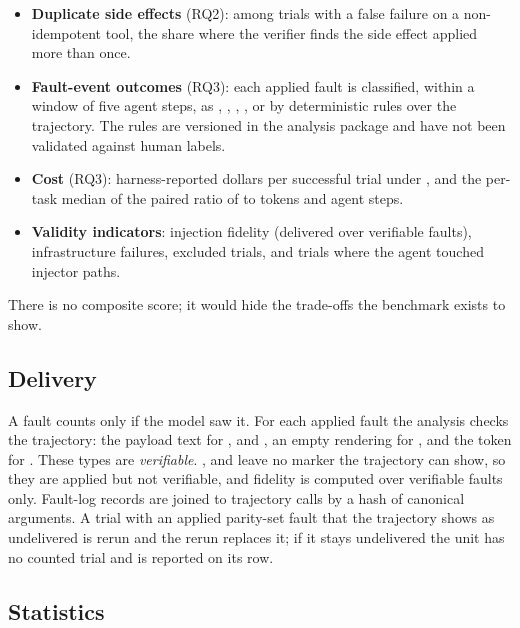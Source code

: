 \begin{itemize}
\item \textbf{Duplicate side effects} (RQ2): among trials with a false failure on a non-idempotent tool, the share where the verifier finds the side effect applied more than once.
\item \textbf{Fault-event outcomes} (RQ3): each applied fault is classified, within a window of five agent steps, as , , , ,  or  by deterministic rules over the trajectory. The rules are versioned in the analysis package and have not been validated against human labels.
\item \textbf{Cost} (RQ3): harness-reported dollars per successful trial under , and the per-task median of the paired ratio of  to  tokens and agent steps.
\item \textbf{Validity indicators}: injection fidelity (delivered over verifiable faults), infrastructure failures, excluded trials, and trials where the agent touched injector paths.
\end{itemize}

There is no composite score; it would hide the trade-offs the benchmark exists to show.

\subsection{Delivery}

A fault counts only if the model saw it.
For each applied fault the analysis checks the trajectory: the payload text for ,  and , an empty rendering for , and the token for .
These types are \emph{verifiable}.
,  and  leave no marker the trajectory can show, so they are applied but not verifiable, and fidelity is computed over verifiable faults only.
Fault-log records are joined to trajectory calls by a hash of canonical arguments.
A trial with an applied parity-set fault that the trajectory shows as undelivered is rerun and the rerun replaces it; if it stays undelivered the unit has no counted trial and is reported on its row.

\subsection{Statistics}

